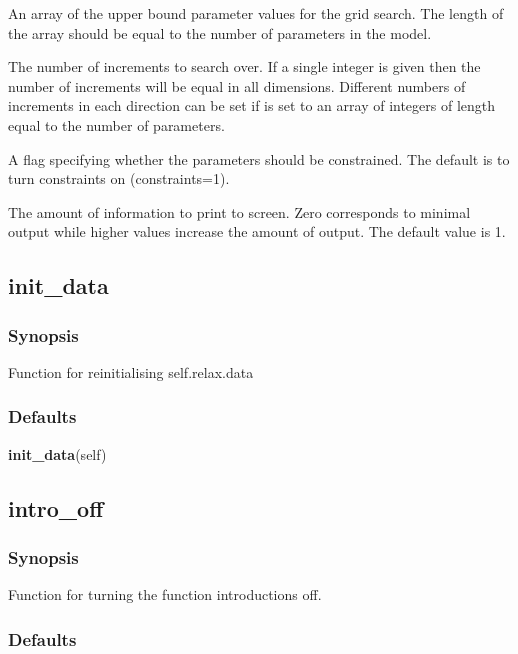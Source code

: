   An array of the upper bound parameter values for the grid search.  The length of the array should be equal to the number of parameters in the model.

  The number of increments to search over.  If a single integer is given then the number of increments will be equal in all dimensions.  Different numbers of increments in each direction can be set if 
 is set to an array of integers of length equal to the number of parameters.

  A flag specifying whether the parameters should be constrained.  The default is to turn constraints on (constraints=1).

  The amount of information to print to screen.  Zero corresponds to minimal output while higher values increase the amount of output.  The default value is 1.


\newpage

\subsection{init\_data}


\subsubsection{Synopsis}

Function for reinitialising self.relax.data

\subsubsection{Defaults}

\textsf{\textbf{init\_data}(self)}



\newpage

\subsection{intro\_off}


\subsubsection{Synopsis}

Function for turning the function introductions off.

\subsubsection{Defaults}

